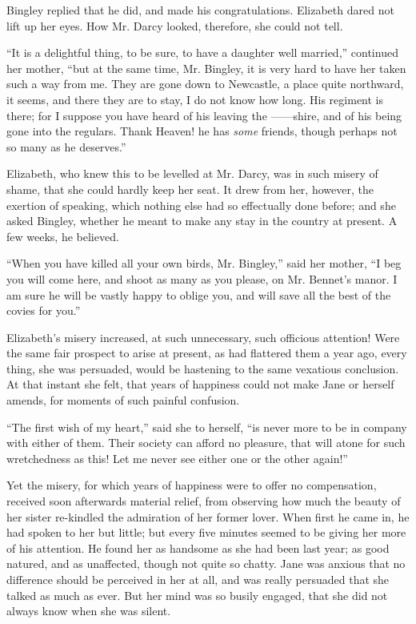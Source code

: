 Bingley replied that he did, and made his congratulations.
Elizabeth dared not lift up her eyes. How Mr.
Darcy looked, therefore, she could not tell.

“It is a delightful thing, to be sure, to have a daughter
well married,” continued her mother, “but at the same
time, Mr. Bingley, it is very hard to have her taken such
a way from me. They are gone down to Newcastle, a place
quite northward, it seems, and there they are to stay,
I do not know how long. His regiment is there; for I
suppose you have heard of his leaving the ------shire, and
of his being gone into the regulars. Thank Heaven! he
has \textit{some} friends, though perhaps not so many as he
deserves.”

Elizabeth, who knew this to be levelled at Mr. Darcy,
was in such misery of shame, that she could hardly keep
her seat. It drew from her, however, the exertion of
speaking, which nothing else had so effectually done
before; and she asked Bingley, whether he meant to
make any stay in the country at present. A few weeks,
he believed.

“When you have killed all your own birds, Mr. Bingley,”
said her mother, “I beg you will come here, and shoot
as many as you please, on Mr. Bennet’s manor. I am
sure he will be vastly happy to oblige you, and will save
all the best of the covies for you.”

Elizabeth’s misery increased, at such unnecessary, such
officious attention! Were the same fair prospect to arise
at present, as had flattered them a year ago, every thing,
she was persuaded, would be hastening to the same
vexatious conclusion. At that instant she felt, that years
of happiness could not make Jane or herself amends, for
moments of such painful confusion.

“The first wish of my heart,” said she to herself, “is
never more to be in company with either of them. Their
society can afford no pleasure, that will atone for such
wretchedness as this! Let me never see either one or the
other again!”

Yet the misery, for which years of happiness were to
offer no compensation, received soon afterwards material
relief, from observing how much the beauty of her sister
re-kindled the admiration of her former lover. When
first he came in, he had spoken to her but little; but
every five minutes seemed to be giving her more of his
attention. He found her as handsome as she had been
last year; as good natured, and as unaffected, though
not quite so chatty. Jane was anxious that no difference
should be perceived in her at all, and was really persuaded
that she talked as much as ever. But her mind was so
busily engaged, that she did not always know when she
was silent.


